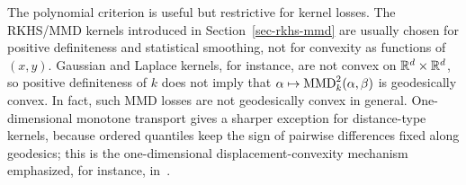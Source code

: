The polynomial criterion is useful but restrictive for kernel losses. The RKHS/MMD kernels introduced in Section~\ref{sec-rkhs-mmd} are usually chosen for positive definiteness and statistical smoothing, not for convexity as functions of \((x,y)\). Gaussian and Laplace kernels, for instance, are not convex on \(\mathbb{R}^d\times\mathbb{R}^d\), so positive definiteness of \(k\) does not imply that \(\alpha\mapsto\operatorname{MMD}_k^2(\alpha,\beta)\) is geodesically convex. In fact, such MMD losses are not geodesically convex in general. One-dimensional monotone transport gives a sharper exception for distance-type kernels, because ordered quantiles keep the sign of pairwise differences fixed along geodesics; this is the one-dimensional displacement-convexity mechanism emphasized, for instance, in~\citet{SantambrogioBook}.

